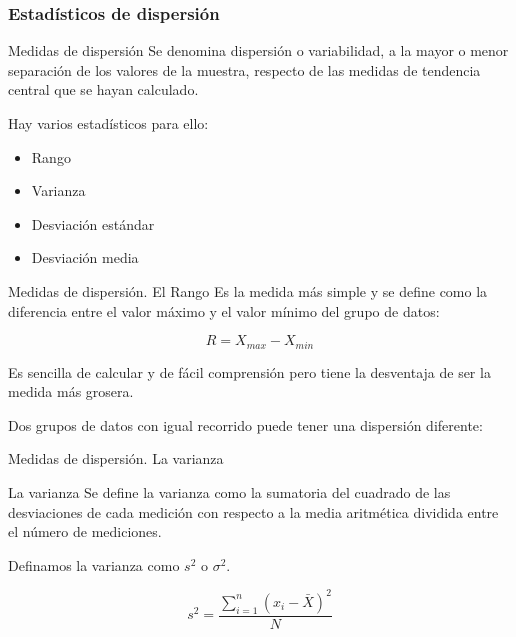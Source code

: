 \documentclass[11pt]{beamer}
\begin{document}
      \subsubsection*{Estadísticos de dispersión}

        \begin{frame}{Medidas de dispersión}
          Se denomina dispersión o variabilidad, a la mayor o menor separación de los valores de la muestra, respecto de las medidas de tendencia central que se hayan calculado.

          Hay varios estadísticos para ello:
          \begin{itemize}
              \item Rango
              \item Varianza
              \item Desviación estándar
              \item Desviación media
          \end{itemize}
        \end{frame}

        \begin{frame}{Medidas de dispersión. El Rango}
            Es la medida más simple y se define como la diferencia entre el valor máximo y el valor mínimo del grupo de datos:

            \begin{center}
                $$ R = X_{max}-X_{min}$$
            \end{center}

            Es sencilla de calcular y de fácil comprensión pero tiene la desventaja de ser la medida más grosera.

            Dos grupos de datos con igual recorrido puede tener una dispersión diferente:
        \end{frame}

        \begin{frame}{Medidas de dispersión. La varianza}
           \begin{block}{La varianza}
               Se define la varianza como la sumatoria del cuadrado de las desviaciones de cada medición con respecto a la media aritmética dividida entre el número de mediciones.
           \end{block}

            Definamos la varianza como $s^2$ o $\sigma^2$.

            $$s^2 = \dfrac{\sum_{i=1}^{n}(x_i-\bar{X})^2}{N}$$
        \end{frame}
\end{document}
